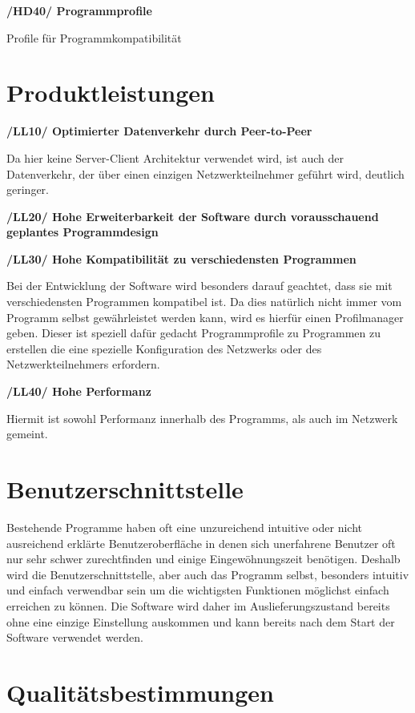 \documentclass[a4paper,12pt]{scrreprt}
\begin{document}
	\textbf{/HD40/ Programmprofile}
	
	Profile für Programmkompatibilität

\chapter{Produktleistungen}
\textbf{/LL10/ Optimierter Datenverkehr durch Peer-to-Peer}
	
	Da hier keine Server-Client Architektur verwendet wird, ist auch der Datenverkehr, der über einen einzigen Netzwerkteilnehmer geführt wird, deutlich geringer.
	
\textbf{/LL20/ Hohe Erweiterbarkeit der Software durch vorausschauend geplantes Programmdesign}
	
\textbf{/LL30/ Hohe Kompatibilität zu verschiedensten Programmen}
	
	Bei der Entwicklung der Software wird besonders darauf geachtet, dass sie mit verschiedensten Programmen kompatibel ist. Da dies natürlich nicht immer vom Programm selbst gewährleistet werden kann, wird es hierfür einen Profilmanager geben. Dieser ist speziell dafür gedacht Programmprofile zu Programmen zu erstellen die eine spezielle Konfiguration des Netzwerks oder des Netzwerkteilnehmers erfordern.
	
\textbf{/LL40/ Hohe Performanz}
	
	Hiermit ist sowohl Performanz innerhalb des Programms, als auch im Netzwerk gemeint.
	
	
	
	
\chapter{Benutzerschnittstelle}
	Bestehende Programme haben oft eine unzureichend intuitive oder nicht ausreichend erklärte Benutzeroberfläche in denen sich unerfahrene Benutzer oft nur sehr schwer zurechtfinden und einige Eingewöhnungszeit benötigen. Deshalb wird die Benutzerschnittstelle, aber auch das Programm selbst, besonders intuitiv und einfach verwendbar sein um die wichtigsten Funktionen möglichst einfach erreichen zu können. Die Software wird daher im Auslieferungszustand bereits ohne eine einzige Einstellung auskommen und kann bereits nach dem Start der Software verwendet werden.
	
	
	
\chapter{Qualitätsbestimmungen}
	
\end{document}
